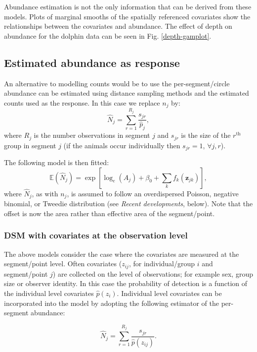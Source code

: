 \documentclass[a4paper,12pt]{article}
\begin{document}
Abundance estimation is not the only information that can be derived from these models. Plots of marginal smooths of the spatially referenced covariates show the relationships between the covariates and abundance. The effect of depth on abundance for the dolphin data can be seen in Fig. \ref{depth-gamplot}. 

\subsection*{Estimated abundance as response}

An alternative to modelling counts would be to use the per-segment/circle abundance can be estimated using distance sampling methods and the estimated counts used as the response. In this case we replace $n_j$ by:
\begin{equation*}
\hat{N}_j = \sum_{r=1}^{R_j} \frac{s_{jr}}{\hat{p}_j},
\end{equation*}
where $R_j$ is the number observations in segment $j$ and $s_{jr}$ is the size of the $r^\text{th}$ group in segment $j$ (if the animals occur individually then $s_{jr}=1$, $\forall j,r$). 

The following model is then fitted:
\begin{equation*}
\mathbb{E}(\hat{N}_j) = \exp\left[ \log_e \left( A_j \right) + \beta_0 + \sum_k f_k\left(\bm{z}_{jk}\right) \right],
\end{equation*}
where $\hat{N}_j$, as with $n_j$, is assumed to follow an overdispersed Poisson, negative binomial, or Tweedie distribution (see \textit{Recent developments}, below). Note that the offset is now the area rather than effective area of the segment/point.

\subsubsection*{DSM with covariates at the observation level}

The above models consider the case where the covariates are measured at the segment/point level. Often covariates ($z_{ij}$, for individual/group $i$ and segment/point $j$) are collected on the level of observations; for example sex, group size or observer identity. In this case the probability of detection is a function of the individual level covariates $\hat{p}(z_i)$. Individual level covariates can be incorporated into the model by adopting the following estimator of the per-segment abundance:

\begin{equation*}
\hat{N}_j = \sum_{r=1}^{R_j} \frac{s_{jr}}{\hat{p}(z_{ij})}.
\end{equation*}
\end{document}
